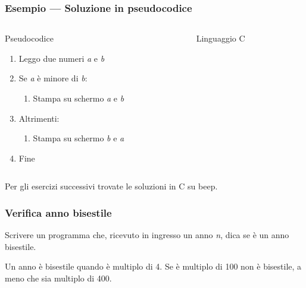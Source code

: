 \documentclass[aspectratio=169,]{beamer}
\begin{document}
\begin{frame}[fragile]
	\frametitle{Esempio --- Soluzione in pseudocodice}
    \begin{columns}
        \begin{column}{0.4\textwidth}
            \begin{block}{Pseudocodice}
                \begin{enumerate}
                    \item Leggo due numeri \emph{a} e \emph{b}
                    \item Se \emph{a} è minore di \emph{b}:
                        \begin{enumerate}
                            \item Stampa su schermo \emph{a} e \emph{b}
                        \end{enumerate}
                    \item Altrimenti:
                        \begin{enumerate}
                            \item Stampa su schermo \emph{b} e \emph{a}
                        \end{enumerate}
                    \item Fine
                \end{enumerate}
            \end{block}
        \end{column}

        \pause
        \begin{column}{0.4\textwidth}
            \begin{block}{Linguaggio C}
                
            \end{block}
        \end{column}
    \end{columns}

    Per gli esercizi successivi trovate le soluzioni in C su beep.
\end{frame}

\begin{frame}
\frametitle{Verifica anno bisestile}
Scrivere un programma che, ricevuto in ingresso un anno \emph{n}, dica se è un anno bisestile.

Un anno è bisestile quando è multiplo di 4. Se è multiplo di 100 non è bisestile, a meno che sia multiplo di 400.
\end{frame}
\end{document}
